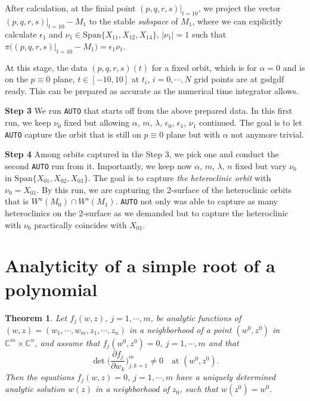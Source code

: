 \documentclass[a4paper,11pt]{article}
\newtheorem{theorem}{Theorem}
\theoremstyle{remark}
\begin{document}
After calculation, at the finial point $(p,q,r,s)|_{t=10}$, we project the vector $(p,q,r,s)|_{t=10}- M_1$ to the stable {\it subspace} of $M_1$, where we can explicitly calculate $\epsilon_1$ and $\nu_1 \in \underset{}{ \textrm{Span}}\{X_{11},X_{12},X_{14}\}$, $|\nu_1|=1$ such that
$\pi\big((p,q,r,s)|_{t=10}- M_1\big) =\epsilon_1 \nu_1$.

At this stage, the data $(p,q,r,s)(t)$ for a fixed orbit, which is for $\alpha=0$ and is on the $p\equiv0$ plane,  $t\in[-10,10]$ at $t_i$, $i=0,\cdots,N$ grid points are at gsdgdf ready. This can be prepared as accurate as the numerical time integrator allows.

{\bf \noindent Step 3}
We run \texttt{AUTO} that starts off from the above prepared data. In this first run, we keep $\nu_0$ fixed but allowing $\alpha$, $m$, $\lambda$, $\epsilon_0$, $\epsilon_1$, $\nu_1$ continued.  The goal is to let \texttt{AUTO} capture the orbit that is still on $p\equiv0$ plane but with $\alpha$ not anymore trivial.

{\bf \noindent Step 4}
Among orbits captured in the Step 3, we pick one and conduct the second \texttt{AUTO} run from it. Importantly, we keep now $\alpha$, $m$, $\lambda$, $n$ fixed but vary $\nu_0$ in $\underset{}{ \textrm{Span}}\{X_{01},X_{02},X_{03}\}$. The goal is to capture {\it the heteroclinic orbit} with $\nu_0=X_{01}$. By this run, we are capturing the 2-surface of the heteroclinic orbits that is $W^u(M_0)\cap W^s(M_1)$. \texttt{AUTO} not only was able to capture as many heteroclinics on the 2-surface as we demanded but to capture the heteroclinic with $\nu_0$ practically coincides with $X_{01}$.

\pagebreak
\appendix
\renewcommand\thetheorem{\Alph{theorem}}
\setcounter{theorem}{\thetmp}
\section{Analyticity of a simple root of a polynomial}



\begin{theorem}{\cite[p. 24]{L1966}} \label{thm:anal} Let $f_j(w,z)$, $j=1,\cdots,m$, be analytic functions of $(w,z)=(w_1,\cdots,w_m,z_1,\cdots,z_n)$ in a neighborhood of a point $(w^0,z^0)$ in $\mathbb{C}^m\times \mathbb{C}^n$, and assume that $f_j(w^0,z^0)=0$, $j=1,\cdots,m$ and that
$$ \det\Big( \frac{\partial f_j}{\partial w_k} \Big)_{j,k=1}^m \ne 0 \quad \text{at $(w^0,z^0)$}.$$
Then the equations $f_j(w,z)=0$, $j=1,\cdots,m$ have a uniquely determined analytic solution $w(z)$ in a neighborhood of $z_0$, such that $w(z^0)=w^0$.
\end{theorem}
\end{document}
